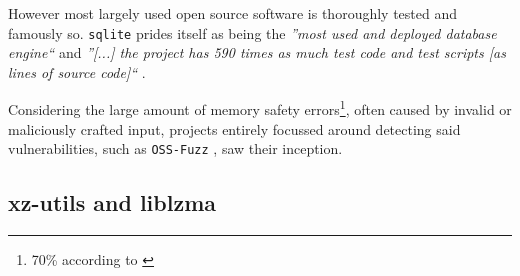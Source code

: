 However most largely used open source software is thoroughly tested and
famously so. \texttt{sqlite} prides itself as being the \textit{''most used and
deployed database engine``} \cite{sqlite2022mostdeployed} and \textit{''[...]
the project has 590 times as much test code and test scripts [as lines of
source code]``} \cite{sqlite2022testing}. 

Considering the large amount of memory safety errors\footnote{70\% according to
\cite{googleUnknownMemorySafety}}, often caused by invalid or maliciously
crafted input, projects entirely focussed around detecting said
vulnerabilities, such as \texttt{OSS-Fuzz} \cite{google2024fuzzing}, saw their
inception.

\subsection{xz-utils and liblzma}

\cite{ccc2024backdoor}
